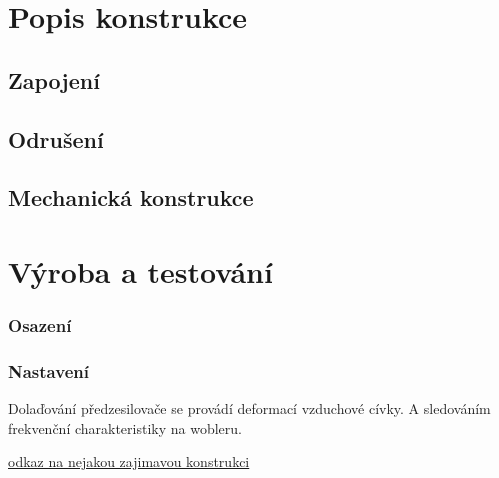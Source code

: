 \documentclass[12pt,a4paper,twoside]{article}
\begin{document}
\newpage
\section{Popis konstrukce}

\subsection{Zapojení}

\subsection{Odrušení}

\subsection{Mechanická konstrukce}

\section{Výroba a testování}

\subsubsection{Osazení}



\subsubsection{Nastavení}

Dolaďování předzesilovače se provádí deformací vzduchové cívky. A sledováním frekvenční charakteristiky na wobleru. 

\begin{thebibliography}{99}
\href{http:// odkaz na nejakou zajimavou konstrukci}{odkaz na nejakou zajimavou konstrukci}

\end{thebibliography}
\end{document}
